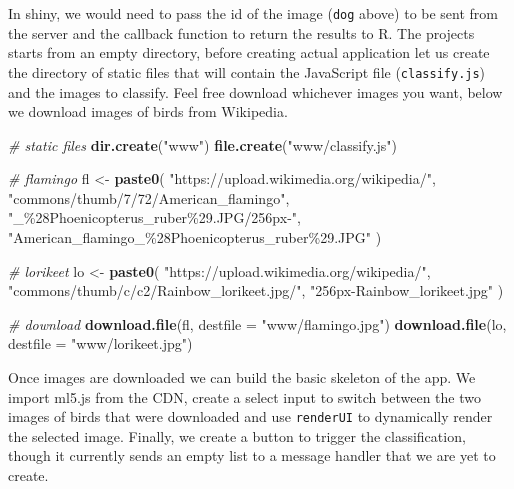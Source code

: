 \documentclass[
]{krantz}
\makeatletter
\newenvironment{Shaded}{\begin{snugshade}}{\end{snugshade}}
\newcommand{\CommentTok}[1]{\textcolor[rgb]{0.37,0.37,0.37}{\textit{#1}}}
\newcommand{\DataTypeTok}[1]{\textcolor[rgb]{0.27,0.27,0.27}{#1}}
\newcommand{\KeywordTok}[1]{\textcolor[rgb]{0.27,0.27,0.27}{\textbf{#1}}}
\newcommand{\NormalTok}[1]{#1}
\newcommand{\StringTok}[1]{\textcolor[rgb]{0.5,0.5,0.5}{#1}}
\newenvironment{kframe}{%
\medskip{}
\setlength{\fboxsep}{.8em}
 \def\at@end@of@kframe{}%
 \ifinner\ifhmode%
  \def\at@end@of@kframe{\end{minipage}}%
  \begin{minipage}{\columnwidth}%
 \fi\fi%
 \def\FrameCommand##1{\hskip\@totalleftmargin \hskip-\fboxsep
 \colorbox{shadecolor}{##1}\hskip-\fboxsep
     \hskip-\linewidth \hskip-\@totalleftmargin \hskip\columnwidth}%
 \MakeFramed {\advance\hsize-\width
   \@totalleftmargin\z@ \linewidth\hsize
   \@setminipage}}%
 {\par\unskip\endMakeFramed%
 \at@end@of@kframe}
\renewenvironment{Shaded}{\begin{kframe}}{\end{kframe}}
\makeatother
\begin{document}
In shiny, we would need to pass the id of the image (\texttt{dog} above) to be sent from the server and the callback function to return the results to R. The projects starts from an empty directory, before creating actual application let us create the directory of static files that will contain the JavaScript file (\texttt{classify.js}) and the images to classify. Feel free download whichever images you want, below we download images of birds from Wikipedia.

\begin{Shaded}
\begin{Highlighting}[]
\CommentTok{\# static files}
\KeywordTok{dir.create}\NormalTok{(}\StringTok{"www"}\NormalTok{)}
\KeywordTok{file.create}\NormalTok{(}\StringTok{"www/classify.js"}\NormalTok{)}

\CommentTok{\# flamingo}
\NormalTok{fl <{-}}\StringTok{ }\KeywordTok{paste0}\NormalTok{(}
  \StringTok{"https://upload.wikimedia.org/wikipedia/"}\NormalTok{,}
  \StringTok{"commons/thumb/7/72/American\_flamingo"}\NormalTok{,}
  \StringTok{"\_\%28Phoenicopterus\_ruber\%29.JPG/256px{-}"}\NormalTok{,}
  \StringTok{"American\_flamingo\_\%28Phoenicopterus\_ruber\%29.JPG"}
\NormalTok{)}

\CommentTok{\# lorikeet}
\NormalTok{lo <{-}}\StringTok{ }\KeywordTok{paste0}\NormalTok{(}
  \StringTok{"https://upload.wikimedia.org/wikipedia/"}\NormalTok{,}
  \StringTok{"commons/thumb/c/c2/Rainbow\_lorikeet.jpg/"}\NormalTok{,}
  \StringTok{"256px{-}Rainbow\_lorikeet.jpg"}
\NormalTok{)}

\CommentTok{\# download}
\KeywordTok{download.file}\NormalTok{(fl, }\DataTypeTok{destfile =} \StringTok{"www/flamingo.jpg"}\NormalTok{)}
\KeywordTok{download.file}\NormalTok{(lo, }\DataTypeTok{destfile =} \StringTok{"www/lorikeet.jpg"}\NormalTok{)}
\end{Highlighting}
\end{Shaded}

Once images are downloaded we can build the basic skeleton of the app. We import ml5.js from the CDN, create a select input to switch between the two images of birds that were downloaded and use \texttt{renderUI} to dynamically render the selected image. Finally, we create a button to trigger the classification, though it currently sends an empty list to a message handler that we are yet to create.
\end{document}

